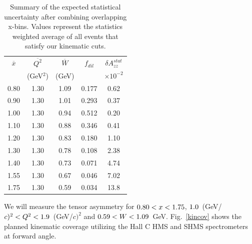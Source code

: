 \begin{table}
\begin{center}
\begin{tabular}{c|c|c|c|c}
 $\overline{x}$  & $\overline{Q^2}$  &  $\overline{W}$ & $f_{dil}$ & $\delta A_{zz}^{stat}$ \\
     & (GeV$^2$)  & (GeV) &  & $\times 10^{-2}$  \\
\hline\hline
    0.80		&  1.30	&  1.09 &  0.177	 & 0.62	\\
    0.90		&  1.30	&  1.01 &  0.293	 & 0.37	\\
    1.00		&  1.30	&  0.94 &  0.512	 & 0.20	\\
    1.10		&  1.30	&  0.88 &  0.346	 & 0.41	\\  
    1.20		&  1.30	&  0.83 &  0.180	 & 1.10	\\  
    1.30		&  1.30	&  0.78 &  0.108	 & 2.38	\\  
    1.40		&  1.30	&  0.73 &  0.071	 & 4.74	\\  
    1.55		&  1.30	&  0.67 &  0.046	 & 7.02	\\              
    1.75		&  1.30	&  0.59 &  0.034	 & 13.8	\\  
\hline\hline
\end{tabular}
\caption{\label{RATES2}Summary of the expected statistical uncertainty after combining overlapping x-bins.  Values represent the statistics weighted average of all events that satisfy our kinematic cuts. }
\end{center}
\end{table}




\label{EXP}
We will measure the tensor asymmetry \Azz for $0.80<x<1.75$, $1.0$~(GeV/$c)^2 < Q^2 <1.9$~(GeV/$c)^2$ and $0.59 < W < 1.09$~GeV. Fig.~\ref{kincov} shows the planned kinematic coverage utilizing the Hall C HMS and SHMS spectrometers at forward angle.

